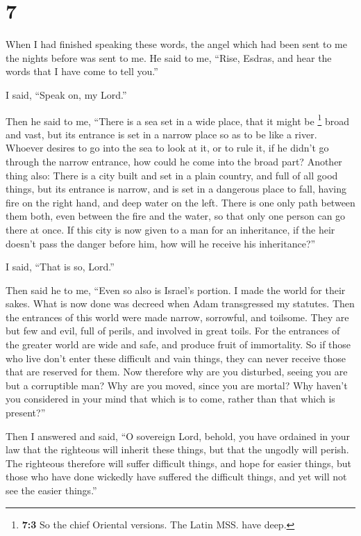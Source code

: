 \hypertarget{section-6}{%
\section{7}\label{section-6}}

 When I had finished speaking these words, the angel which
had been sent to me the nights before was sent to me.  He
said to me, ``Rise, Esdras, and hear the words that I have come to tell
you.''

 I said, ``Speak on, my Lord.''

Then he said to me, ``There is a sea set in a wide place, that it might
be \footnote{\textbf{7:3} So the chief Oriental versions. The Latin MSS.
  have deep.} broad and vast,  but its entrance is set in
a narrow place so as to be like a river.  Whoever desires
to go into the sea to look at it, or to rule it, if he didn't go through
the narrow entrance, how could he come into the broad part?
 Another thing also: There is a city built and set in a
plain country, and full of all good things,  but its
entrance is narrow, and is set in a dangerous place to fall, having fire
on the right hand, and deep water on the left.  There is
one only path between them both, even between the fire and the water, so
that only one person can go there at once.  If this city
is now given to a man for an inheritance, if the heir doesn't pass the
danger before him, how will he receive his inheritance?''

 I said, ``That is so, Lord.''

Then said he to me, ``Even so also is Israel's portion. 
I made the world for their sakes. What is now done was decreed when Adam
transgressed my statutes.  Then the entrances of this
world were made narrow, sorrowful, and toilsome. They are but few and
evil, full of perils, and involved in great toils.  For
the entrances of the greater world are wide and safe, and produce fruit
of immortality.  So if those who live don't enter these
difficult and vain things, they can never receive those that are
reserved for them.  Now therefore why are you disturbed,
seeing you are but a corruptible man? Why are you moved, since you are
mortal?  Why haven't you considered in your mind that
which is to come, rather than that which is present?''

 Then I answered and said, ``O sovereign Lord, behold,
you have ordained in your law that the righteous will inherit these
things, but that the ungodly will perish.  The righteous
therefore will suffer difficult things, and hope for easier things, but
those who have done wickedly have suffered the difficult things, and yet
will not see the easier things.''

